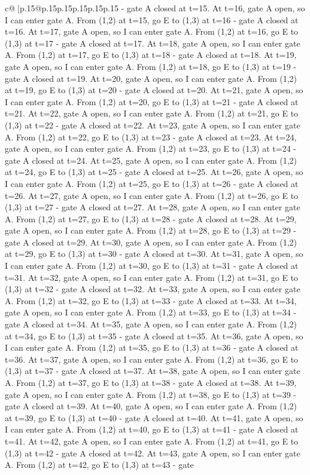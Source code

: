 \documentclass{article}
\begin{document}
{\begin{supertabular}{c@{$\;$}|p{.15\linewidth}@{}p{.15\linewidth}p{.15\linewidth}p{.15\linewidth}p{.15\linewidth}p{.15\linewidth}}
{{{{-} gate A closed at t=15. At t=16, gate A open, so I can enter gate A. From (1,2) at t=15, go E to (1,3) at t=16 {-} gate A closed at t=16. At t=17, gate A open, so I can enter gate A. From (1,2) at t=16, go E to (1,3) at t=17 {-} gate A closed at t=17. At t=18, gate A open, so I can enter gate A. From (1,2) at t=17, go E to (1,3) at t=18 {-} gate A closed at t=18. At t=19, gate A open, so I can enter gate A. From (1,2) at t=18, go E to (1,3) at t=19 {-} gate A closed at t=19. At t=20, gate A open, so I can enter gate A. From (1,2) at t=19, go E to (1,3) at t=20 {-} gate A closed at t=20. At t=21, gate A open, so I can enter gate A. From (1,2) at t=20, go E to (1,3) at t=21 {-} gate A closed at t=21. At t=22, gate A open, so I can enter gate A. From (1,2) at t=21, go E to (1,3) at t=22 {-} gate A closed at t=22. At t=23, gate A open, so I can enter gate A. From (1,2) at t=22, go E to (1,3) at t=23 {-} gate A closed at t=23. At t=24, gate A open, so I can enter gate A. From (1,2) at t=23, go E to (1,3) at t=24 {-} gate A closed at t=24. At t=25, gate A open, so I can enter gate A. From (1,2) at t=24, go E to (1,3) at t=25 {-} gate A closed at t=25. At t=26, gate A open, so I can enter gate A. From (1,2) at t=25, go E to (1,3) at t=26 {-} gate A closed at t=26. At t=27, gate A open, so I can enter gate A. From (1,2) at t=26, go E to (1,3) at t=27 {-} gate A closed at t=27. At t=28, gate A open, so I can enter gate A. From (1,2) at t=27, go E to (1,3) at t=28 {-} gate A closed at t=28. At t=29, gate A open, so I can enter gate A. From (1,2) at t=28, go E to (1,3) at t=29 {-} gate A closed at t=29. At t=30, gate A open, so I can enter gate A. From (1,2) at t=29, go E to (1,3) at t=30 {-} gate A closed at t=30. At t=31, gate A open, so I can enter gate A. From (1,2) at t=30, go E to (1,3) at t=31 {-} gate A closed at t=31. At t=32, gate A open, so I can enter gate A. From (1,2) at t=31, go E to (1,3) at t=32 {-} gate A closed at t=32. At t=33, gate A open, so I can enter gate A. From (1,2) at t=32, go E to (1,3) at t=33 {-} gate A closed at t=33. At t=34, gate A open, so I can enter gate A. From (1,2) at t=33, go E to (1,3) at t=34 {-} gate A closed at t=34. At t=35, gate A open, so I can enter gate A. From (1,2) at t=34, go E to (1,3) at t=35 {-} gate A closed at t=35. At t=36, gate A open, so I can enter gate A. From (1,2) at t=35, go E to (1,3) at t=36 {-} gate A closed at t=36. At t=37, gate A open, so I can enter gate A. From (1,2) at t=36, go E to (1,3) at t=37 {-} gate A closed at t=37. At t=38, gate A open, so I can enter gate A. From (1,2) at t=37, go E to (1,3) at t=38 {-} gate A closed at t=38. At t=39, gate A open, so I can enter gate A. From (1,2) at t=38, go E to (1,3) at t=39 {-} gate A closed at t=39. At t=40, gate A open, so I can enter gate A. From (1,2) at t=39, go E to (1,3) at t=40 {-} gate A closed at t=40. At t=41, gate A open, so I can enter gate A. From (1,2) at t=40, go E to (1,3) at t=41 {-} gate A closed at t=41. At t=42, gate A open, so I can enter gate A. From (1,2) at t=41, go E to (1,3) at t=42 {-} gate A closed at t=42. At t=43, gate A open, so I can enter gate A. From (1,2) at t=42, go E to (1,3) at t=43 {-} gate }}}
\end{supertabular}}
\end{document}
